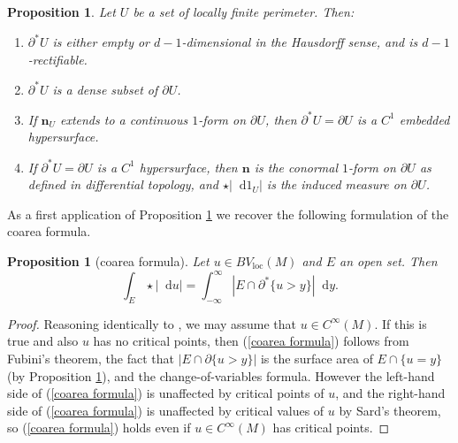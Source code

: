 \documentclass[reqno,11pt]{amsart}
\DeclareMathOperator{\supp}{supp}
\newcommand*\dif{\mathop{}\!\mathrm{d}}
\newcommand{\normal}{\mathbf n}
\newcommand{\loc}{\mathrm{loc}}
\newtheorem{proposition}[theorem]{Proposition}
\theoremstyle{definition}
\numberwithin{equation}{section}
\begin{document}
\begin{proposition}\label{locality of Caccioppoli}
    Let $U$ be a set of locally finite perimeter.
    Then:
    \begin{enumerate}
    \item $\partial^* U$ is either empty or $d-1$-dimensional in the Hausdorff sense, and is $d-1$-rectifiable.
    \item $\partial^* U$ is a dense subset of $\partial U$.
    \item If $\normal_U$ extends to a continuous $1$-form on $\partial U$, then $\partial^* U = \partial U$ is a $C^1$ embedded hypersurface.
    \item If $\partial^* U = \partial U$ is a $C^1$ hypersurface, then $\normal$ is the conormal $1$-form on $\partial U$ as defined in differential topology, and $\star |\dif 1_U|$ is the induced measure on $\partial U$.
\end{enumerate}
\end{proposition}

As a first application of Proposition \ref{locality of Caccioppoli} we recover the following formulation of the coarea formula.

\begin{proposition}[coarea formula]\label{Coarea2}
Let $u \in BV_\loc(M)$ and $E$ an open set. Then
\begin{equation}\label{coarea formula}
\int_E \star |\dif u| = \int_{-\infty}^\infty |E \cap \partial^* \{u > y\}| \dif y.
\end{equation}
\end{proposition}
\begin{proof}
Reasoning identically to \cite[Theorem 1.23]{Giusti77}, we may assume that $u \in C^\infty(M)$.
If this is true and also $u$ has no critical points, then (\ref{coarea formula}) follows from Fubini's theorem, the fact that $|E \cap \partial \{u > y\}|$ is the surface area of $E \cap \{u = y\}$ (by Proposition \ref{locality of Caccioppoli}), and the change-of-variables formula.
However the left-hand side of (\ref{coarea formula}) is unaffected by critical points of $u$, and the right-hand side of (\ref{coarea formula}) is unaffected by critical values of $u$ by Sard's theorem, so (\ref{coarea formula}) holds even if $u \in C^\infty(M)$ has critical points.
\end{proof}
\end{document}
